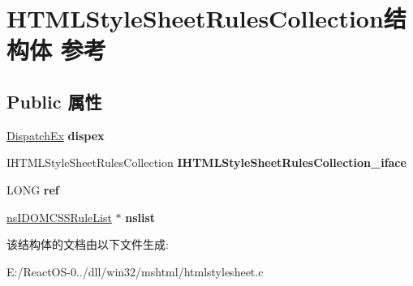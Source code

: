 \hypertarget{struct_h_t_m_l_style_sheet_rules_collection}{}\section{H\+T\+M\+L\+Style\+Sheet\+Rules\+Collection结构体 参考}
\label{struct_h_t_m_l_style_sheet_rules_collection}
\subsection*{Public 属性}
\begin{DoxyCompactItemize}
\item 
\mbox{\label{struct_h_t_m_l_style_sheet_rules_collection_ae80bd8cddd4e007900bd17b7bdca09e4}} 
\hyperlink{struct_dispatch_ex}{Dispatch\+Ex} {\bfseries dispex}
\item 
\mbox{\label{struct_h_t_m_l_style_sheet_rules_collection_a52fe559250566a85ac7f41d0b7c187df}} 
I\+H\+T\+M\+L\+Style\+Sheet\+Rules\+Collection {\bfseries I\+H\+T\+M\+L\+Style\+Sheet\+Rules\+Collection\+\_\+iface}
\item 
\mbox{\label{struct_h_t_m_l_style_sheet_rules_collection_a4176c38c4939d3997cbf8c0dee184ebd}} 
L\+O\+NG {\bfseries ref}
\item 
\mbox{\label{struct_h_t_m_l_style_sheet_rules_collection_ad54e7f28f9c0017acf1b25ade874e9bf}} 
\hyperlink{interfacens_i_d_o_m_c_s_s_rule_list}{ns\+I\+D\+O\+M\+C\+S\+S\+Rule\+List} $\ast$ {\bfseries nslist}
\end{DoxyCompactItemize}


该结构体的文档由以下文件生成\+:\begin{DoxyCompactItemize}
\item 
E\+:/\+React\+O\+S-\/0../dll/win32/mshtml/htmlstylesheet.\+c\end{DoxyCompactItemize}
